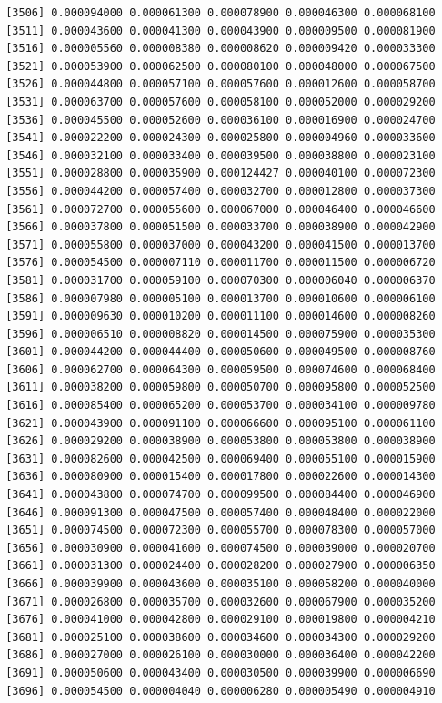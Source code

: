\documentclass[]{article}
\begin{document}
\begin{verbatim}
 [3506] 0.000094000 0.000061300 0.000078900 0.000046300 0.000068100
 [3511] 0.000043600 0.000041300 0.000043900 0.000009500 0.000081900
 [3516] 0.000005560 0.000008380 0.000008620 0.000009420 0.000033300
 [3521] 0.000053900 0.000062500 0.000080100 0.000048000 0.000067500
 [3526] 0.000044800 0.000057100 0.000057600 0.000012600 0.000058700
 [3531] 0.000063700 0.000057600 0.000058100 0.000052000 0.000029200
 [3536] 0.000045500 0.000052600 0.000036100 0.000016900 0.000024700
 [3541] 0.000022200 0.000024300 0.000025800 0.000004960 0.000033600
 [3546] 0.000032100 0.000033400 0.000039500 0.000038800 0.000023100
 [3551] 0.000028800 0.000035900 0.000124427 0.000040100 0.000072300
 [3556] 0.000044200 0.000057400 0.000032700 0.000012800 0.000037300
 [3561] 0.000072700 0.000055600 0.000067000 0.000046400 0.000046600
 [3566] 0.000037800 0.000051500 0.000033700 0.000038900 0.000042900
 [3571] 0.000055800 0.000037000 0.000043200 0.000041500 0.000013700
 [3576] 0.000054500 0.000007110 0.000011700 0.000011500 0.000006720
 [3581] 0.000031700 0.000059100 0.000070300 0.000006040 0.000006370
 [3586] 0.000007980 0.000005100 0.000013700 0.000010600 0.000006100
 [3591] 0.000009630 0.000010200 0.000011100 0.000014600 0.000008260
 [3596] 0.000006510 0.000008820 0.000014500 0.000075900 0.000035300
 [3601] 0.000044200 0.000044400 0.000050600 0.000049500 0.000008760
 [3606] 0.000062700 0.000064300 0.000059500 0.000074600 0.000068400
 [3611] 0.000038200 0.000059800 0.000050700 0.000095800 0.000052500
 [3616] 0.000085400 0.000065200 0.000053700 0.000034100 0.000009780
 [3621] 0.000043900 0.000091100 0.000066600 0.000095100 0.000061100
 [3626] 0.000029200 0.000038900 0.000053800 0.000053800 0.000038900
 [3631] 0.000082600 0.000042500 0.000069400 0.000055100 0.000015900
 [3636] 0.000080900 0.000015400 0.000017800 0.000022600 0.000014300
 [3641] 0.000043800 0.000074700 0.000099500 0.000084400 0.000046900
 [3646] 0.000091300 0.000047500 0.000057400 0.000048400 0.000022000
 [3651] 0.000074500 0.000072300 0.000055700 0.000078300 0.000057000
 [3656] 0.000030900 0.000041600 0.000074500 0.000039000 0.000020700
 [3661] 0.000031300 0.000024400 0.000028200 0.000027900 0.000006350
 [3666] 0.000039900 0.000043600 0.000035100 0.000058200 0.000040000
 [3671] 0.000026800 0.000035700 0.000032600 0.000067900 0.000035200
 [3676] 0.000041000 0.000042800 0.000029100 0.000019800 0.000004210
 [3681] 0.000025100 0.000038600 0.000034600 0.000034300 0.000029200
 [3686] 0.000027000 0.000026100 0.000030000 0.000036400 0.000042200
 [3691] 0.000050600 0.000043400 0.000030500 0.000039900 0.000006690
 [3696] 0.000054500 0.000004040 0.000006280 0.000005490 0.000004910

\end{verbatim}
\end{document}
